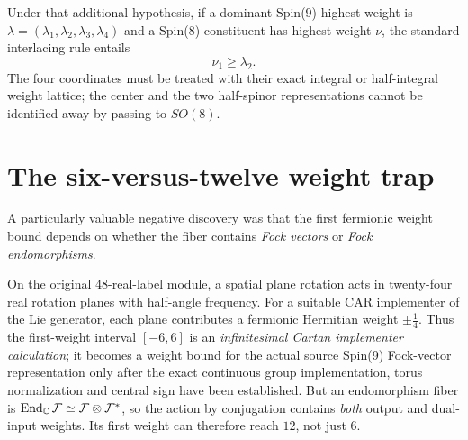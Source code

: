 Under that additional hypothesis, if a dominant Spin(9) highest
weight is $\lambda=(\lambda_1,\lambda_2,\lambda_3,\lambda_4)$
and a Spin(8) constituent has highest weight $\nu$, the standard
interlacing rule entails
\begin{equation}\label{eq:branching-inequality}
  \nu_1\ge\lambda_2.
\end{equation}
The four coordinates must be treated with their exact integral or
half-integral weight lattice; the center and the two half-spinor
representations cannot be identified away by passing to $SO(8)$.

\section{The six-versus-twelve weight trap}
A particularly valuable negative discovery was that the first
fermionic weight bound depends on whether the fiber contains
\emph{Fock vectors} or \emph{Fock endomorphisms}.

On the original 48-real-label module, a spatial plane rotation acts
in twenty-four real rotation planes with half-angle frequency.
For a suitable CAR implementer of the Lie generator, each plane
contributes a fermionic Hermitian weight $\pm\frac14$.
Thus the first-weight interval $[-6,6]$ is an \emph{infinitesimal Cartan
implementer calculation}; it becomes a weight bound for the actual
source Spin(9) Fock-vector representation only after the exact
continuous group implementation, torus normalization and central sign
have been established.
But an endomorphism fiber is $\operatorname{End}_{\mathbb C}\mathcal F
\simeq\mathcal F\otimes\mathcal F^*$, so the action by conjugation
contains \emph{both} output and dual-input weights. Its first weight
can therefore reach $12$, not just $6$.

